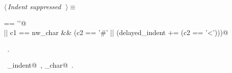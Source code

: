 \documentclass{report}
\begin{document}
\begin{flushleft} \small
\begin{minipage}{\linewidth} \label{scrap180}
$\langle\,${\it Indent suppressed}\nobreak\ {\footnotesize {}}$\,\rangle\equiv$
\vspace{-1ex}
\begin{list}{}{} \item
\mbox{} == '\n'@\\
\mbox{}\verb@|| c1 == nw_char && (c2 == '#' || (delayed_indent += (c2 == '<')))@{\NWsep}
\end{list}
\vspace{-1ex}
\footnotesize\addtolength{\baselineskip}{-1ex}
\begin{list}{}{\setlength{\itemsep}{-\parsep}\setlength{\itemindent}{-\leftmargin}}
\item \NWtxtMacroRefIn\ .
\end{list}
\vspace{-2ex}
\footnotesize\addtolength{\baselineskip}{-1ex}
\begin{list}{}{\setlength{\itemsep}{-\parsep}\setlength{\itemindent}{-\leftmargin}}
\item \NWtxtIdentsUsed\nobreak\  \verb@delayed_indent@\nobreak\ , \verb@nw_char@\nobreak\ .\end{list}
\end{minipage}\\[4ex]
\end{flushleft}
\end{document}

